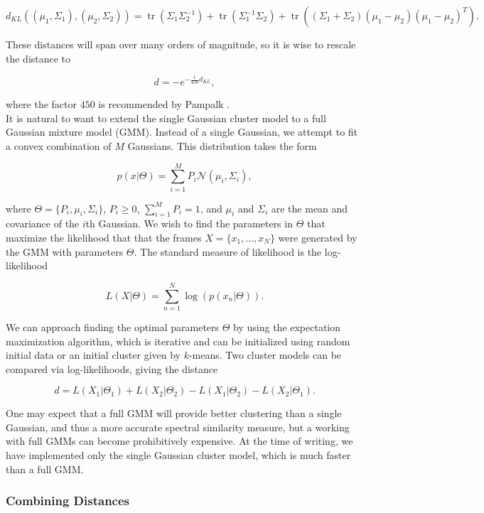 \documentclass[12pt]{article}
\begin{document}
\[ d_{KL}\left(\left(\mu_1,\Sigma_1\right),\left(\mu_2,\Sigma_2\right)\right) = \operatorname{tr}\left(\Sigma_1\Sigma_2^{-1}\right) + \operatorname{tr}\left(\Sigma_1^{-1}\Sigma_2\right) + \operatorname{tr}\left(\left(\Sigma_1+\Sigma_2\right)(\mu_1-\mu_2)(\mu_1-\mu_2)^T\right). \] 

\noindent These distances will span over many orders of magnitude, so it is wise to rescale the distance to

\[ d = -e^{-\frac{1}{450}d_{KL}}, \] 

\noindent where the factor $450$ is recommended by Pampalk \cite{pampalk:dissertation}.\\

It is natural to want to extend the single Gaussian cluster model to a full Gaussian mixture model (GMM).  Instead of a single Gaussian, we attempt to fit a convex combination of $M$ Gaussians.  This distribution takes the form

\[ p(x|\Theta) = \sum_{i=1}^M P_i \mathcal{N}(\mu_i, \Sigma_i), \] 

\noindent where $\Theta = \{P_i,\mu_i,\Sigma_i\}$, $P_i\ge 0$, $\sum_{i=1}^M P_i = 1$, and $\mu_i$ and $\Sigma_i$ are the mean and covariance of the $i$th Gaussian.  We wish to find the parameters in $\Theta$ that maximize the likelihood that that the frames $X = \{x_1,...,x_N\}$ were generated by the GMM with parameters $\Theta$.  The standard measure of likelihood is the log-likelihood

\[ L(X|\Theta) = \sum_{n=1}^N \log\left(p(x_n|\Theta)\right). \] 

\noindent We can approach finding the optimal parameters $\Theta$ by using the expectation maximization algorithm, which is iterative and can be initialized using random initial data or an initial cluster given by $k$-means.  Two cluster models can be compared via log-likelihoods, giving the distance

\[ d = L(X_1|\Theta_1) + L(X_2|\Theta_2) - L(X_1|\Theta_2) - L(X_2|\Theta_1). \] 

One may expect that a full GMM will provide better clustering than a single Gaussian, and thus a more accurate spectral similarity measure, but a working with full GMMs can become prohibitively expensive.  At the time of writing, we have implemented only the single Gaussian cluster model, which is much faster than a full GMM.\\

\subsubsection{Combining Distances}
\end{document}
